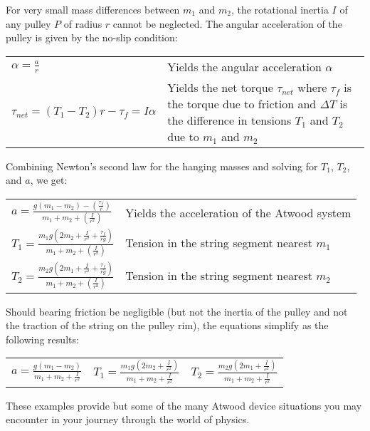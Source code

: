 %
%

For very small mass differences between $m_1$ and $m_2$, the rotational inertia $I$ of any pulley $P$ of radius $r$ cannot be neglected. The angular acceleration of the pulley is given by the no-slip condition:

\begin{longtable}{p{} p{}}
    \( \displaystyle \alpha = \frac{a}{r} \) & Yields the angular acceleration $\alpha$ \\
    \(\displaystyle \tau_{net}=\left(T_1 - T_2 \right)r - \tau_f = I \alpha \) & Yields the net torque $\tau_{net}$ where $\tau_f$ is the torque due to friction and $\Delta T$ is the difference in tensions $T_1$ and $T_2$ due to $m_1$ and $m_2$ \\
\end{longtable}

Combining Newton's second law for the hanging masses and solving for $T_1$, $T_2$, and $a$, we get:

\begin{longtable}{p{} p{}}
    \( \displaystyle a = \frac{g \left(m_1 - m_2 \right) - \left( \frac{\tau_f}{r} \right)}{m_1 + m_2 + \left(\frac{I}{r^2} \right)}\) & Yields the acceleration of the Atwood system \\
    \(\displaystyle T_1 = \frac{m_1 g \left(2 m_2 + \frac{I}{r^2} + \frac{\tau_f}{r g} \right)}{m_1 + m_2 + \left(\frac{I}{r^2} \right)}\) & Tension in the string segment nearest $m_1$ \\
    \(\displaystyle T_2 = \frac{m_2 g \left(2 m_1 + \frac{I}{r^2} + \frac{\tau_f}{r g}\right)}{m_1 + m_2 + \left(\frac{I}{r^2}\right)} \) & Tension in the string segment nearest $m_2$
\end{longtable}

Should bearing friction be negligible (but not the inertia of the pulley and not the traction of the string on the pulley rim), the equations simplify as the following results:

\begin{longtable}{p{} p{} p{}}
    \( \displaystyle a = \frac{g \left(m_1 - m_2 \right)}{m_1 + m_2 + \frac{I}{r^2}} \) &
    \( \displaystyle T_1 = \frac{m_1 g \left(2 m_2 + \frac{I}{r^2} \right)}{m_1 + m_2 + \frac{I}{r^2}} \) &
    \( \displaystyle T_2 = \frac{m_2 g \left(2 m_1 + \frac{I}{r^2} \right)}{m_1 + m_2 + \frac{I}{r^2}} \) \\
\end{longtable}

These examples provide but some of the many Atwood device situations you may encounter in your journey through the world of physics.

